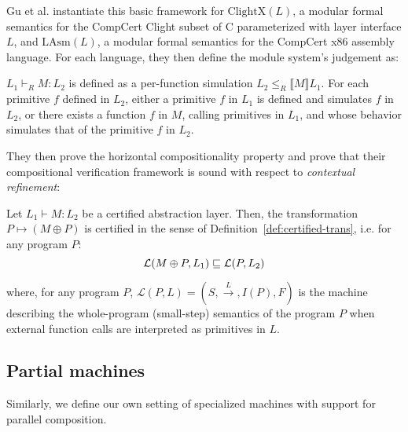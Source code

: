 Gu et al. instantiate this basic framework for
$\text{ClightX}(L)$, a modular formal semantics for the CompCert
Clight subset of C parameterized with layer interface $L$, and
$\text{LAsm}(L)$, a modular formal semantics for the CompCert x86
assembly language. For each language, they then define
the module system's judgement as:
\begin{definition} \label{def:popl15-layers}
$L_1 \vdash_R M : L_2$ is defined as a per-function simulation
$L_2 \leqslant_R \llbracket M \rrbracket L_1$. For
  each primitive $f$ defined in $L_2$, either a primitive $f$ in $L_1$
  is defined and simulates $f$ in $L_2$, or there exists a function
  $f$ in $M$, calling primitives in $L_1$, and whose behavior
  simulates that of the primitive $f$ in $L_2$.
\end{definition}
They then prove the horizontal compositionality
property
and prove that their compositional
verification framework is sound with respect to \emph{contextual
  refinement}:

\begin{theorem}
Let $L_1 \vdash M : L_2$ be a certified abstraction layer. Then, the
transformation $P \mapsto (M \oplus P)$ is certified in the sense of
Definition~\ref{def:certified-trans}, i.e. for any program $P$:
\[ \mathcal{L}(M \oplus P, L_1) \sqsubseteq \mathcal{L}(P, L_2) \]
\end{theorem}
\noindent where, for any program 
{\small $P$, $\mathcal{L}(P, L) = (S,
\stackrel{L}{\rightarrow}, I(P), F)$} is the machine describing the
whole-program (small-step) semantics of the program $P$ when external
function calls are interpreted as primitives in $L$.

\subsection{Partial machines}

Similarly,
we define our own setting of specialized machines
with support for parallel composition.

